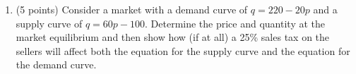 \documentclass{article}
\newcommand{\mybigskip}{\vspace{1in}}
\newcommand{\myitem}{\item (5 points)\ }
\begin{document}
\begin{enumerate}
\begin{comment}
    \begin{EXAM}\mybigskip\end{EXAM}

    \begin{KEY} Demand decreases. Equilibrium price and quantity fall.\end{KEY}

    \myitem Saddam blows up oil wells in Iraq, Kuwait, and Saudi Arabia.

    \begin{EXAM}\mybigskip\end{EXAM}

    \begin{KEY}Supply decreases. Equilibrium price increases, equilibrium quantity falls.\end{KEY}

    \item \textbf{Bonus problem!} Explain why the possibility that Saddam might blow up oil wells next week (or next month) affects oil prices \emph{today}. %

    \begin{EXAM}\mybigskip\end{EXAM}

    \begin{KEY}This goes back to capital theory: people who own oil can either ``invest in the bank" (by selling the oil today and putting the money in the bank, where it will grow at the rate of interest) or ``invest in the oil" (by selling the oil next week or next month instead of today). \end{KEY}
    \end{enumerate}



\end{comment}







\item \begin{EXAM} (5 points) Consider a market with a demand curve of $q=220-20p$ and a supply curve of $q=60p-100$. Determine the price and quantity at the market equilibrium and then show how (if at all) a 25\% sales tax on the sellers will affect both the equation for the supply curve and the equation for the demand curve. \vspace{4cm} \end{EXAM}


\end{enumerate}
\end{document}
